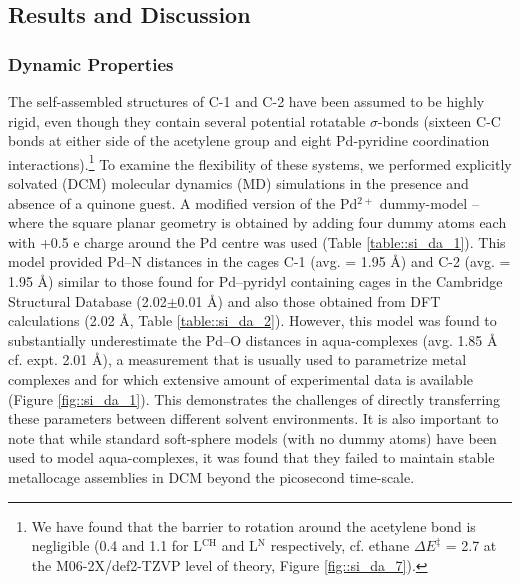 \documentclass[../../main.tex]{subfiles}
\begin{document}
\subsection{Results and Discussion}

\subsubsection{Dynamic Properties} 

The self-assembled structures of C-1 and C-2 have been assumed to be highly rigid, even though they contain several potential rotatable $\sigma$-bonds (sixteen C-C bonds at either side of the acetylene group and eight Pd-pyridine coordination interactions).\footnote{We have found that the barrier to rotation around the acetylene bond is negligible (0.4 and 1.1 \kcalx for L${}^\text{CH}$ and L${}^\text{N}$ respectively, cf. ethane $\Delta E^\ddagger$ = 2.7 \kcalx at the M06-2X/def2-TZVP level of theory, Figure \ref{fig::si_da_7}).} To examine the flexibility of these systems, we performed explicitly solvated (DCM) molecular dynamics (MD) simulations in the presence and absence of a quinone guest. A modified version of the Pd${}^{2+}$ dummy-model – where the square planar geometry is obtained by adding four dummy atoms each with +0.5 e charge around the Pd centre was used (Table \ref{table::si_da_1}).\cite{Duarte2014} This model provided Pd–N distances in the cages C-1 (avg. = 1.95 \AA) and C-2 (avg. = 1.95 \AA) similar to those found for Pd–pyridyl containing cages in the Cambridge Structural Database (2.02$\pm$0.01 \AA)\cite{Lewis2012, August2016} and also those obtained from DFT calculations (2.02 \AA, Table \ref{table::si_da_2}). However, this model was found to substantially underestimate the Pd–O distances in aqua-complexes (avg. 1.85 \AA$\;$ cf. expt.\cite{Persson2010} 2.01 \AA), a measurement that is usually used to parametrize metal complexes and for which extensive amount of experimental data is available (Figure \ref{fig::si_da_1}).\cite{Li2017} This demonstrates the challenges of directly transferring these parameters between different solvent environments. It is also important to note that while standard soft-sphere models (with no dummy atoms) have been used to model aqua-complexes, it was found that they failed to maintain stable metallocage assemblies in DCM beyond the picosecond time-scale. 
\end{document}
